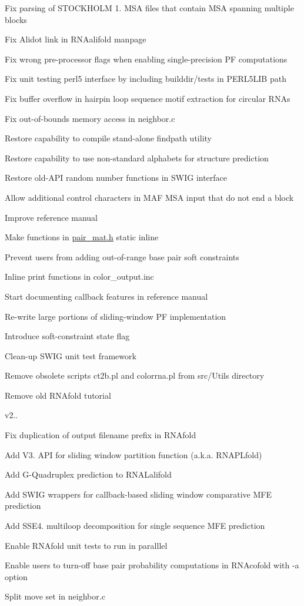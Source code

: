 \begin{DoxyItemize}
\item Fix parsing of S\+T\+O\+C\+K\+H\+O\+LM 1. M\+SA files that contain M\+SA spanning multiple blocks
\item Fix Alidot link in R\+N\+Aalifold manpage
\item Fix wrong pre-\/processor flags when enabling single-\/precision PF computations
\item Fix unit testing perl5 interface by including builddir/tests in P\+E\+R\+L5\+L\+IB path
\item Fix buffer overflow in hairpin loop sequence motif extraction for circular R\+N\+As
\item Fix out-\/of-\/bounds memory access in neighbor.\+c
\item Restore capability to compile stand-\/alone findpath utility
\item Restore capability to use non-\/standard alphabets for structure prediction
\item Restore old-\/\+A\+PI random number functions in S\+W\+IG interface
\item Allow additional control characters in M\+AF M\+SA input that do not end a block
\item Improve reference manual
\item Make functions in \hyperlink{pair__mat_8h_source}{pair\+\_\+mat.\+h} static inline
\item Prevent users from adding out-\/of-\/range base pair soft constraints
\item Inline print functions in color\+\_\+output.\+inc
\item Start documenting callback features in reference manual
\item Re-\/write large portions of sliding-\/window PF implementation
\item Introduce soft-\/constraint state flag
\item Clean-\/up S\+W\+IG unit test framework
\item Remove obsolete scripts ct2b.\+pl and colorrna.\+pl from src/\+Utils directory
\item Remove old R\+N\+Afold tutorial
\end{DoxyItemize}

v2..
\begin{DoxyItemize}
\item Fix duplication of output filename prefix in R\+N\+Afold
\item Add V3. A\+PI for sliding window partition function (a.\+k.\+a. R\+N\+A\+P\+Lfold)
\item Add G-\/\+Quadruplex prediction to R\+N\+A\+Lalifold
\item Add S\+W\+IG wrappers for callback-\/based sliding window comparative M\+FE prediction
\item Add S\+S\+E4. multiloop decomposition for single sequence M\+FE prediction
\item Enable R\+N\+Afold unit tests to run in paralllel
\item Enable users to turn-\/off base pair probability computations in R\+N\+Acofold with -\/a option
\item Split move set in neighbor.\+c
\end{DoxyItemize}

